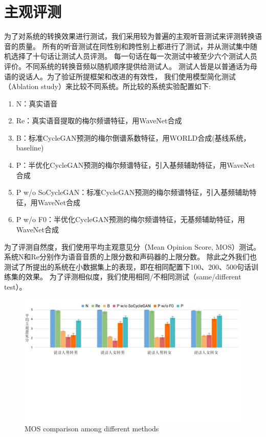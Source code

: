 \section{主观评测}
为了对系统的转换效果进行测试，我们采用较为普遍的主观听音测试来评测转换语音的质量。
所有的听音测试在同性别和跨性别上都进行了测试，并从测试集中随机选择了十句话让测试人员评测。
每一句话在每一次测试中被至少六个测试人员评价。不同系统的转换音频以随机顺序提供给测试人。
测试人皆是以普通话为母语的说话人。为了验证所提框架和改进的有效性，
我们使用模型简化测试（Ablation study）来比较不同系统。所比较的系统实验配置如下:

\begin{enumerate}
    \item N：真实语音
    \item Re：真实语音提取的梅尔频谱特征，用WaveNet合成
    \item B：标准CycleGAN预测的梅尔倒谱系数特征，用WORLD合成(基线系统，baseline)
    \item P：半优化CycleGAN预测的梅尔频谱特征，引入基频辅助特征，用WaveNet合成
    \item P w/o SoCycleGAN：标准CycleGAN预测的梅尔频谱特征，引入基频辅助特征，用WaveNet合成
    \item P w/o F0：半优化CycleGAN预测的梅尔频谱特征，无基频辅助特征，用WaveNet合成
\end{enumerate}

为了评测自然度，我们使用平均主观意见分（Mean Opinion Score, MOS）测试。
系统N和Re分别作为语音音质的上限分数和声码器的上限分数。
除此之外我们也测试了所提出的系统在小数据集上的表现，即在相同配置下100、200、500句话训练集的效果。
为了评测相似度，我们使用相同/不相同测试（same/different test）。

\begin{figure}[!htp]
    \centering
    \includegraphics[width=13cm,trim=0 290 0 0,clip]{figure/4_mos.png}
    {MOS comparison among different methods}
    \label{fig:mos}
\end{figure}

